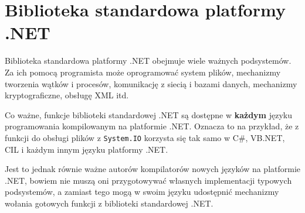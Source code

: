 ﻿\section{Biblioteka standardowa platformy .NET}

Biblioteka standardowa platformy .NET obejmuje 
wiele ważnych podsystemów. 
Za ich pomocą programista może oprogramować system plików, mechanizmy tworzenia wątków i procesów, komunikację z siecią 
i bazami danych, mechanizmy kryptograficzne, obsługę XML itd. 

Co ważne, funkcje 
biblioteki standardowej .NET są dostępne w {\bf każdym} języku programowania kompilowanym na platformie .NET. 
Oznacza to na przykład, że z funkcji do obsługi plików z {\tt System.IO} korzysta się
tak samo w C\#, VB.NET, CIL i każdym innym języku platformy .NET. 

Jest to jednak równie ważne autorów kompilatorów nowych języków na platformie
.NET, bowiem nie muszą oni przygotowywać własnych implementacji typowych podsystemów, a zamiast tego 
mogą w swoim języku udostępnić mechanizmy wołania gotowych funkcji z biblioteki standardowej .NET.






